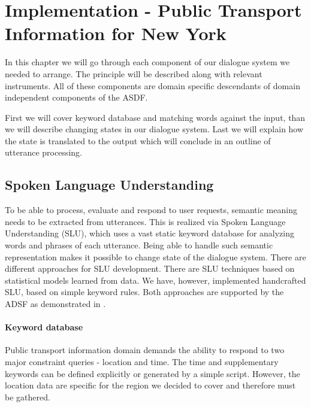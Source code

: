 \chapter{Implementation - Public Transport Information for New York}

In this chapter we will go through each component of our dialogue system we needed to arrange.
The principle will be described along with relevant instruments. %
All of these components are domain specific descendants of domain independent components of the ASDF.

First we will cover keyword database and matching words against the input, than we will describe changing states in our dialogue system.
Last we will explain how the state is translated to the output which will conclude in an outline of utterance processing. %

\section{Spoken Language Understanding}

To be able to process, evaluate and respond to user requests, semantic meaning needs to be extracted from utterances. %
This is realized via Spoken Language Understanding (SLU), which uses a vast static keyword database for analyzing words and phrases of each utterance.
Being able to handle such semantic representation makes it possible to change state of the dialogue system.
There are different approaches for SLU development.
There are SLU techniques based on statistical models learned from data.
We have, however, implemented handcrafted SLU, based on simple keyword rules.
Both approaches are supported by the ADSF as demonstrated in \cite{slu}.


\subsubsection{Keyword database} 

Public transport information domain demands the ability to respond to two major constraint queries - location and time.
The time and supplementary keywords can be defined explicitly or generated by a simple script.
However, the location data are specific for the region we decided to cover and therefore must be gathered.

